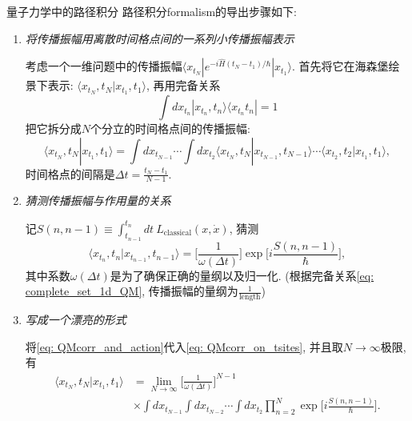 \begin{mybox}{量子力学中的路径积分}
  路径积分formalism的导出步骤如下:
  \begin{enumerate}
    \item \textit{将传播振幅用离散时间格点间的一系列小传播振幅表示}

          考虑一个一维问题中的传播振幅$\langle x_{t_N}|e^{-i\hat{H}(t_N-t_1)/\hbar}|x_{t_1} \rangle$.
          首先将它在海森堡绘景下表示: $\langle x_{t_N}, t_N|x_{t_1}, t_1 \rangle$, 再用完备关系
          \begin{equation}\label{eq: complete_set_1d_QM}
            \int dx_{t_n} |x_{t_n}, t_n\rangle\langle x_{t_n} t_n| = 1
          \end{equation}
          把它拆分成$N$个分立的时间格点间的传播振幅:
          \begin{equation}\label{eq: QMcorr_on_tsites}
            \langle x_{t_N}, t_N|x_{t_1}, t_1 \rangle = \int dx_{t_{N-1}} \cdots \int dx_{t_2} \langle x_{t_N}, t_N|x_{t_{N-1}}, t_{N-1} \rangle \cdots \langle x_{t_2}, t_2|x_{t_1}, t_1 \rangle,
          \end{equation}
          时间格点的间隔是$\Delta t = \frac{t_N-t_1}{N-1}$.
    \item \textit{猜测传播振幅与作用量的关系}

          记$S(n,n-1) \equiv \int_{t_{n-1}}^{t_n}dt\ L_\text{classical}(x, \dot{x})$, 猜测
          \begin{equation}\label{eq: QMcorr_and_action}
            \langle x_{t_n}, t_n|x_{t_{n-1}}, t_{n-1} \rangle = \biggl[\frac{1}{\omega(\Delta t)}\biggr]\exp\biggl[i\frac{S(n,n-1)}{\hbar}\biggr],
          \end{equation}
          其中系数$\omega(\Delta t)$是为了确保正确的量纲以及归一化.
          (根据完备关系\eqref{eq: complete_set_1d_QM}, 传播振幅的量纲为$\frac{1}{\text{length}}$)
    \item \textit{写成一个漂亮的形式}

          将\eqref{eq: QMcorr_and_action}代入\eqref{eq: QMcorr_on_tsites}, 并且取$N\rightarrow \infty$极限, 有
          \begin{equation}
            \begin{aligned}
              \langle x_{t_N}, t_N|x_{t_1}, t_1 \rangle & = \lim_{N\rightarrow \infty}\biggl[\frac{1}{\omega(\Delta t)}\biggr]^{N-1}                                               \\
                                                        & \times \int dx_{t_{N-1}}\int dx_{t_{N-2}} \cdots \int dx_{t_2} \prod_{n=2}^{N}\exp\biggl[i\frac{S(n,n-1)}{\hbar}\biggr].
            \end{aligned}
          \end{equation}


\end{enumerate}
\end{mybox}
